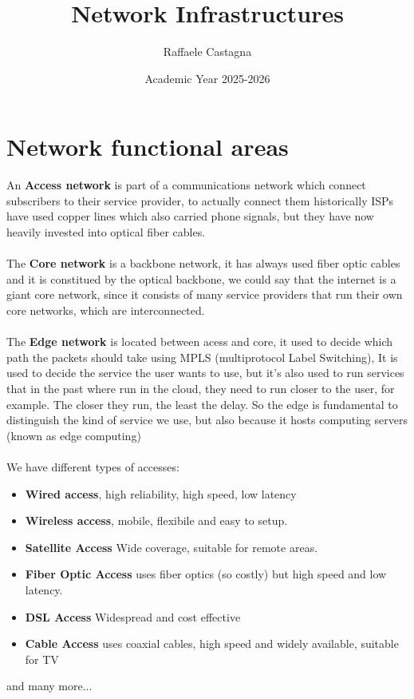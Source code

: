 \documentclass[11pt, a4paper]{article}
\title{Network Infrastructures }
\author{Raffaele Castagna}
\date{Academic Year 2025-2026}
\begin{document}
\maketitle
\tableofcontents
\newpage
\section{Network functional areas}
An \textbf{Access network} is part of a communications network which connect subscribers to their service provider, to actually connect them historically ISPs have used copper lines which also carried phone signals, but they have now heavily invested into optical fiber cables.\\\\
The \textbf{Core network} is a backbone network, it has always used fiber optic cables and it is constitued by the optical backbone, we could say that the internet is a giant core network, since it consists of many service providers that run their own core networks, which are interconnected.\\\\
The \textbf{Edge network} is located between acess and core, it used to decide which path the packets should take using MPLS (multiprotocol Label Switching), It is used to decide the service the user wants to use, but it's also used to run
services that in the past where run in the cloud, they need to run closer to the
user, for example. The closer they run, the least the delay.
So the edge is fundamental to distinguish the kind of service we use, but also
because it hosts computing servers (known as edge computing)\\\\
We have different types of accesses:
\begin{itemize}
    \item \textbf{Wired access}, high reliability, high speed, low latency
    \item \textbf{Wireless access}, mobile, flexibile and easy to setup.
    \item \textbf{Satellite Access} Wide coverage, suitable for remote areas.
    \item \textbf{Fiber Optic Access} uses fiber optics (so costly) but high speed and low latency.
    \item \textbf{DSL Access} Widespread and cost effective
    \item \textbf{Cable Access} uses coaxial cables, high speed and widely available, suitable for TV
\end{itemize}
and many more...\\\\
\end{document}

